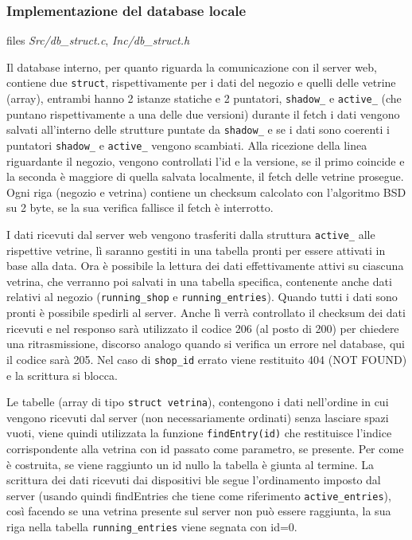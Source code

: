 \subsubsection{Implementazione del database locale}

files \textit{Src/db\_struct.c}, \textit{Inc/db\_struct.h}

Il database interno, per quanto riguarda la comunicazione con il server web, contiene due \texttt{struct}, rispettivamente per i dati del negozio e quelli delle vetrine (array), entrambi hanno 2 istanze statiche e 2 puntatori, \texttt{shadow\_} e \texttt{active\_} (che puntano rispettivamente a una delle due versioni) durante il fetch i dati vengono salvati all'interno delle strutture puntate da \texttt{shadow\_} e se i dati sono coerenti i puntatori \texttt{shadow\_} e \texttt{active\_} vengono scambiati. Alla ricezione della linea riguardante il negozio, vengono controllati l'id e la versione, se il primo coincide e la seconda \`e maggiore di quella salvata localmente, il fetch delle vetrine prosegue. Ogni riga (negozio e vetrina) contiene un checksum calcolato con l'algoritmo BSD su 2 byte, se la sua verifica fallisce il fetch \`e interrotto.

I dati ricevuti dal server web vengono trasferiti dalla struttura \texttt{active\_} alle rispettive vetrine, l\`i saranno gestiti in una tabella pronti per essere attivati in base alla data. Ora \`e possibile la lettura dei dati effettivamente attivi su ciascuna vetrina, che verranno poi salvati in una tabella specifica, contenente anche dati relativi al negozio (\texttt{running\_shop} e \texttt{running\_entries}). Quando tutti i dati sono pronti \`e possibile spedirli al server. Anche l\`i verr\`a controllato il checksum dei dati ricevuti e nel responso sar\`a utilizzato il codice 206 (al posto di 200) per chiedere una ritrasmissione, discorso analogo quando si verifica un errore nel database, qui il codice sar\`a 205. Nel caso di \texttt{shop\_id} errato viene restituito 404 (NOT FOUND) e la scrittura si blocca.

Le tabelle (array di tipo \texttt{struct vetrina}), contengono i dati nell'ordine in cui vengono ricevuti dal server (non necessariamente ordinati) senza lasciare spazi vuoti, viene quindi utilizzata la funzione \texttt{findEntry(id)} che restituisce l'indice corrispondente alla vetrina con id passato come parametro, se presente. Per come \`e costruita, se viene raggiunto un id nullo la tabella \`e giunta al termine. La scrittura dei dati ricevuti dai dispositivi ble segue l'ordinamento imposto dal server (usando quindi findEntries che tiene come riferimento \texttt{active\_entries}), cos\`i facendo se una vetrina presente sul server non pu\`o essere raggiunta, la sua riga nella tabella \texttt{running\_entries} viene segnata con id=0.

